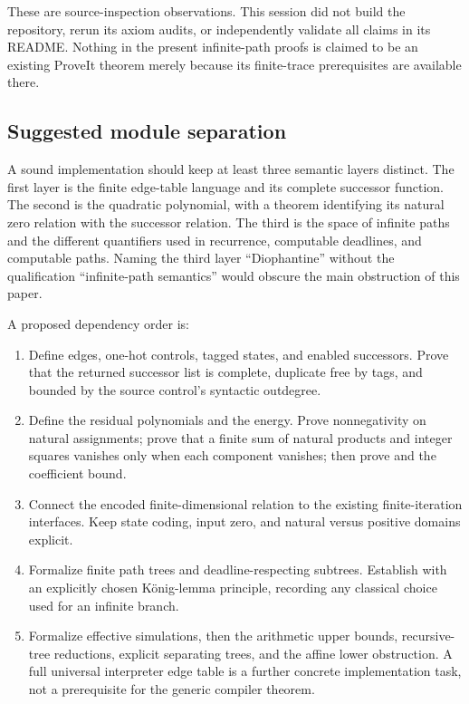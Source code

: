 \documentclass[11pt,letterpaper]{article}
\theoremstyle{definition}
\theoremstyle{remark}
\newcommand{\1}{\mathbf 1}
\begin{document}
These are source-inspection observations. This session did not build the
repository, rerun its axiom audits, or independently validate all claims in
its README. Nothing in the present infinite-path proofs is claimed to be
an existing ProveIt theorem merely because its finite-trace prerequisites
are available there.

\subsection{Suggested module separation}

A sound implementation should keep at least three semantic layers distinct.
The first layer is the finite edge-table language and its complete successor
function. The second is the quadratic polynomial, with a theorem identifying
its natural zero relation with the successor relation. The third is the
space of infinite paths and the different quantifiers used in recurrence,
computable deadlines, and computable paths. Naming the third layer
``Diophantine'' without the qualification ``infinite-path semantics'' would
obscure the main obstruction of this paper.

A proposed dependency order is:
\begin{enumerate}[label=\arabic*.,leftmargin=2em]
\item Define edges, one-hot controls, tagged states, and enabled successors.
Prove that the returned successor list is complete, duplicate free by tags,
and bounded by the source control's syntactic outdegree.
\item Define the residual polynomials and the energy. Prove nonnegativity
on natural assignments; prove that a finite sum of natural products and
integer squares vanishes only when each component vanishes; then prove
 and the coefficient bound.
\item Connect the encoded finite-dimensional relation to the existing
finite-iteration interfaces. Keep state coding, input zero, and natural
versus positive domains explicit.
\item Formalize finite path trees and deadline-respecting subtrees. Establish
 with an explicitly chosen K\"onig-lemma principle,
recording any classical choice used for an infinite branch.
\item Formalize effective simulations, then the arithmetic upper bounds,
recursive-tree reductions, explicit separating trees, and the affine lower
obstruction. A full universal interpreter edge table is a further concrete
implementation task, not a prerequisite for the generic compiler theorem.
\end{enumerate}
\end{document}
